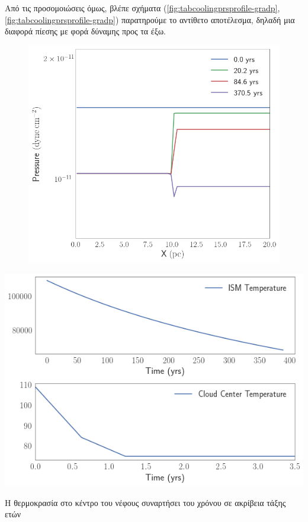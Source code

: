 	
	Από τις προσομοιώσεις όμως, βλέπε σχήματα (\ref{fig:tabcoolingprsprofile-gradp},\ref{fig:tabcoolingprsprofile-gradp}) παρατηρούμε το αντίθετο αποτέλεσμα, δηλαδή μια διαφορά πίεσης με φορά δύναμης προς τα έξω. 

\begin{figure}
	\centering
	\includegraphics[width=1\linewidth]{DataImages/TabCoolingPRSprofile-micro}
	\caption{}
	\label{fig:tabcoolingprsprofile-micro}
\end{figure}

	
\begin{marginfigure}
	\includegraphics[width=1\linewidth]{DataImages/TabCoolingTMPcenterISM}
	\caption{Η θερμοκρασία στο κέντρο του νέφους συναρτήσει του χρόνου σε ακρίβεια τάξης ετών}
	\label{fig:tabcoolingtmpcenter}
\end{marginfigure}
	
